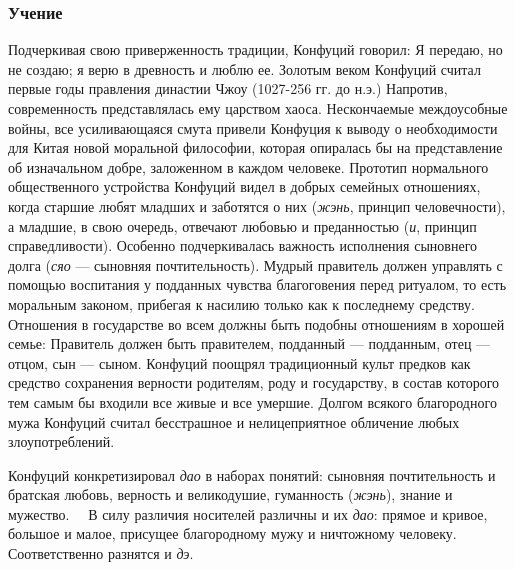 \documentclass[twoside,a4paper]{article}
\begin{document}
\subsubsection{Учение }
{
Подчеркивая свою приверженность традиции, Конфуций говорил: {\textquotedbl}Я передаю, но не создаю; я верю в древность и
люблю ее{\textquotedbl}. Золотым веком Конфуций считал первые годы правления династии Чжоу (1027-256 гг. до н.э.)
Напротив, современность представлялась ему царством хаоса. Нескончаемые междоусобные войны, все усиливающаяся смута
привели Конфуция к выводу о необходимости для Китая новой моральной философии, которая опиралась бы на представление об
изначальном добре, заложенном в каждом человеке. Прототип нормального общественного устройства Конфуций видел в добрых
семейных отношениях, когда старшие любят младших и заботятся о них (\textit{жэнь}, принцип
{\textquotedbl}человечности{\textquotedbl}), а младшие, в свою очередь, отвечают любовью и преданностью (\textit{и},
принцип {\textquotedbl}справедливости{\textquotedbl}). Особенно подчеркивалась важность исполнения сыновнего долга
(\textit{сяо} — {\textquotedbl}сыновняя почтительность{\textquotedbl}). Мудрый правитель должен управлять с помощью
воспитания у подданных чувства благоговения перед {\textquotedbl}ритуалом{\textquotedbl}, то есть моральным законом,
прибегая к насилию только как к последнему средству. Отношения в государстве во всем должны быть подобны отношениям в
хорошей семье: {\textquotedbl}Правитель должен быть правителем, подданный — подданным, отец — отцом, сын —
сыном{\textquotedbl}. Конфуций поощрял традиционный культ предков как средство сохранения верности родителям, роду и
государству, в состав которого тем самым бы входили все живые и все умершие. Долгом всякого {\textquotedbl}благородного
мужа{\textquotedbl} Конфуций считал бесстрашное и нелицеприятное обличение любых злоупотреблений.}

{
Конфуций конкретизировал \textit{дао} в наборах понятий: {\textquotedbl}сыновняя почтительность{\textquotedbl} и
{\textquotedbl}братская любовь{\textquotedbl}, {\textquotedbl}верность{\textquotedbl} и
{\textquotedbl}великодушие{\textquotedbl}, {\textquotedbl}гуманность{\textquotedbl} (\textit{жэнь}),
{\textquotedbl}знание{\textquotedbl} и {\textquotedbl}мужество{\textquotedbl}. \ \ В силу различия носителей различны и
их \textit{дао}: прямое и кривое, большое и малое, присущее {\textquotedbl}благородному мужу{\textquotedbl} и
{\textquotedbl}ничтожному человеку{\textquotedbl}. Соответственно разнятся и \textit{дэ}. }
\end{document}
